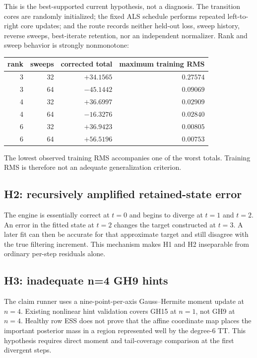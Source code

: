 \documentclass[11pt]{article}
\begin{document}
This is the best-supported current hypothesis, not a diagnosis. The transition
cores are randomly initialized; the fixed ALS schedule performs repeated
left-to-right core updates; and the route records neither held-out loss, sweep
history, reverse sweeps, best-iterate retention, nor an independent
normalizer. Rank and sweep behavior is strongly nonmonotone:
\begin{center}
\begin{tabular}{rrrr}
\toprule
rank & sweeps & corrected total & maximum training RMS\\
\midrule
3 & 32 & $+34.1565$ & $0.27574$\\
3 & 64 & $-45.1442$ & $0.09069$\\
4 & 32 & $+36.6997$ & $0.02909$\\
4 & 64 & $-16.3276$ & $0.02840$\\
6 & 32 & $+36.9423$ & $0.00805$\\
6 & 64 & $+56.5196$ & $0.00753$\\
\bottomrule
\end{tabular}
\end{center}
The lowest observed training RMS accompanies one of the worst totals. Training
RMS is therefore not an adequate generalization criterion.

\subsection{H2: recursively amplified retained-state error}

The engine is essentially correct at $t=0$ and begins to diverge at $t=1$ and
$t=2$. An error in the fitted state at $t=2$ changes the target constructed at
$t=3$. A later fit can then be accurate for that approximate target and still
disagree with the true filtering increment. This mechanism makes H1 and H2
inseparable from ordinary per-step residuals alone.

\subsection{H3: inadequate n=4 GH9 hints}

The claim runner uses a nine-point-per-axis Gauss--Hermite moment update at
$n=4$. Existing nonlinear hint validation covers GH15 at $n=1$, not GH9 at
$n=4$. Healthy row ESS does not prove that the affine coordinate map places
the important posterior mass in a region represented well by the degree-6 TT.
This hypothesis requires direct moment and tail-coverage comparison at the
first divergent steps.
\end{document}
